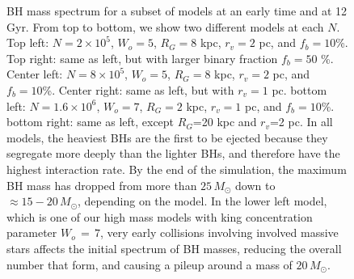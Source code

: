 \documentclass[12pt,preprint]{aastex}
\begin{document}

\begin{figure}[!ht]


	\caption{BH mass spectrum for a subset of models at an early time and at 12 Gyr. From top to bottom,
	we show two different models at each $N$. Top left: $N=2 \times 10^5$, $W_o=5$, $R_G=8$ kpc, $r_v=2$ pc, and $f_b=10$\%.
	Top right:	same as left, but with larger binary fraction $f_b=50$ \%. Center left: $N=8 \times 10^5$,
	 $W_o=5$, $R_G=8$ kpc, $r_v=2$ pc, and $f_b=10$\%. Center right: same as left, but with $r_v=1$ pc. 
	 bottom left:  $N=1.6 \times 10^6$, $W_o=7$, $R_G=2$ kpc, $r_v=1$ pc, and $f_b=10$\%. bottom right: same as left, except
	 $R_G$=20 kpc and $r_v$=2 pc.
 In all models, the heaviest BHs are the first to be ejected because they segregate more deeply than the lighter BHs, and therefore have the highest interaction rate. By the end of the simulation, the maximum BH mass has dropped from more than $25\,M_\odot$ down to $\approx 15-20\,M_\odot$, depending on the model. In the lower left model, which is one of our high mass models with king concentration parameter $W_o\,=\,7$, very early collisions involving involved massive stars affects the initial spectrum of BH masses, reducing the overall number that form, and causing a pileup around a mass of $20\,M_\odot$.}
	\label{fig:BHmasses}
\end{figure}






\end{document}
